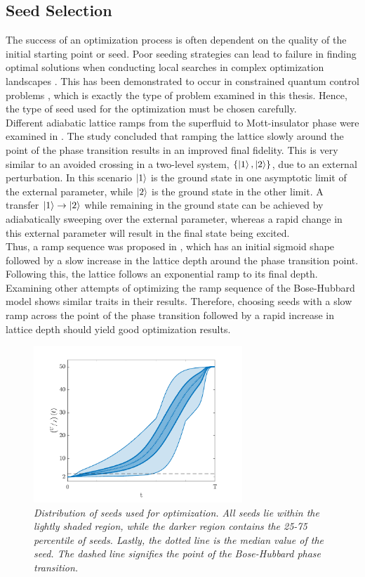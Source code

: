 \subsection{Seed Selection}
The success of an optimization process is often dependent on the quality of the initial starting point or seed. Poor seeding strategies can lead to failure in finding optimal solutions when conducting local searches in complex optimization landscapes \cite{Sorensen2016}. This has been demonstrated to occur in constrained quantum control problems \cite{Zhdanov2015}, which is exactly the type of problem examined in this thesis. Hence, the type of seed used for the optimization must be chosen carefully.\\ 
Different adiabatic lattice ramps from the superfluid to Mott-insulator phase were examined in \cite{Zakrzewski2009}. The study concluded that ramping the lattice slowly around the point of the phase transition results in an improved final fidelity. This is very similar to an avoided crossing in a two-level system, $\{ \ket{1} , \ket{2} \}$, due to an external perturbation. In this scenario $\ket{1}$ is the ground state in one asymptotic limit of the external parameter, while $\ket{2}$ is the ground state in the other limit. A transfer $\ket{1} \to \ket{2}$ while remaining in the ground state can be achieved by adiabatically sweeping over the external parameter, whereas a rapid change in this external parameter will result in the final state being excited.\\
Thus, a ramp sequence was proposed in \cite{Zakrzewski2009}, which has an initial sigmoid shape followed by a slow increase in the lattice depth around the phase transition point. Following this, the lattice follows an exponential ramp to its final depth. Examining other attempts of optimizing the ramp sequence of the Bose-Hubbard model \cite{Doria2011,FrankBloch} shows similar traits in their results. Therefore, choosing seeds with a slow ramp across the point of the phase transition followed by a rapid increase in lattice depth should yield good optimization results.
\begin{figure}[h!]
    \centering
    \includegraphics[width=0.7\textwidth]{Figures/LinSigSeed.pdf}
    \caption{\textit{Distribution of seeds used for optimization. All seeds lie within the lightly shaded region, while the darker region contains the 25-75 percentile of seeds. Lastly, the dotted line is the median value of the seed. The dashed line signifies the point of the Bose-Hubbard phase transition.}}
    \label{fig:LinSigSeed}
\end{figure}
